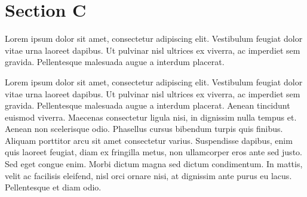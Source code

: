\documentclass{article}
\begin{document}
\endnumbering

\section{Section C}

\begin{pairs}
\begin{Leftside}
\beginnumbering
\pstart
Lorem ipsum dolor sit amet, consectetur adipiscing elit. Vestibulum feugiat dolor vitae urna laoreet dapibus. Ut pulvinar nisl ultrices ex viverra, ac imperdiet sem gravida. Pellentesque malesuada augue a interdum placerat.
\pend
\endnumbering
\end{Leftside}

\begin{Rightside}
\beginnumbering
\pstart
Lorem ipsum dolor sit amet, consectetur adipiscing elit. Vestibulum feugiat dolor vitae urna laoreet dapibus. Ut pulvinar nisl ultrices ex viverra, ac imperdiet sem gravida. Pellentesque malesuada augue a interdum placerat. Aenean tincidunt euismod viverra. Maecenas consectetur ligula nisi, in dignissim nulla tempus et. Aenean non scelerisque odio. Phasellus cursus bibendum turpis quis finibus. Aliquam porttitor arcu sit amet consectetur varius. Suspendisse dapibus, enim quis laoreet feugiat, diam ex fringilla metus, non ullamcorper eros ante sed justo. Sed eget congue enim. Morbi dictum magna sed dictum condimentum. In mattis, velit ac facilisis eleifend, nisl orci ornare nisi, at dignissim ante purus eu lacus. Pellentesque et diam odio.
\pend
\endnumbering
\end{Rightside}
\end{pairs}
\Columns
\end{document}
